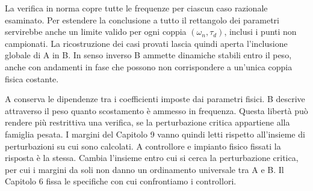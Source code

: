 La verifica in norma copre tutte le frequenze per ciascun caso
razionale esaminato. Per estendere la conclusione a tutto il
rettangolo dei parametri servirebbe anche un limite valido
per ogni coppia $(\omega_n,\tau_d)$, inclusi i punti non campionati.
La ricostruzione dei casi provati lascia quindi aperta l'inclusione
globale di A in B. In senso inverso B ammette dinamiche stabili
entro il peso, anche con andamenti in fase che possono non
corrispondere a un'unica coppia fisica costante.

A conserva le dipendenze tra i coefficienti imposte dai parametri
fisici. B descrive attraverso il peso quanto scostamento è ammesso
in frequenza. Questa libertà può rendere più restrittiva una
verifica, se la perturbazione critica appartiene alla famiglia
pesata. I margini del Capitolo 9 vanno quindi letti rispetto
all'insieme di perturbazioni su cui sono calcolati. A controllore
e impianto fisico fissati la risposta è la stessa. Cambia
l'insieme entro cui si cerca la perturbazione critica, per cui i
margini da soli non danno un ordinamento universale tra A e B.
Il Capitolo 6 fissa le specifiche con cui confrontiamo i controllori.

